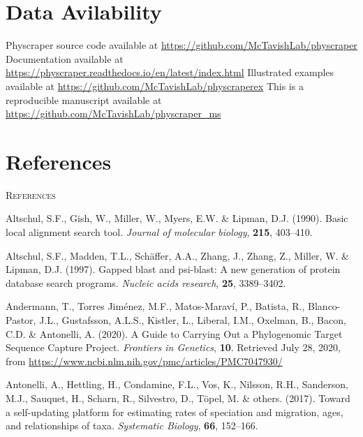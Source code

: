 \documentclass[]{article}
\begin{document}
\hypertarget{data-avilability}{%
\section{Data Avilability}\label{data-avilability}}

Physcraper source code available at \url{https://github.com/McTavishLab/physcraper}
Documentation available at \url{https://physcraper.readthedocs.io/en/latest/index.html}
Illustrated examples available at \url{https://github.com/McTavishLab/physcraperex}
This is a reproducible manuscript available at \url{https://github.com/McTavishLab/physcraper_ms}

\newpage

\hypertarget{references}{%
\section{References}\label{references}}

\newpage
\begin{center}
\textsc{References}
\end{center}

\hypertarget{refs}{}
\leavevmode\hypertarget{ref-altschul1990basic}{}%
Altschul, S.F., Gish, W., Miller, W., Myers, E.W. \& Lipman, D.J. (1990). Basic local alignment search tool. \emph{Journal of molecular biology}, \textbf{215}, 403--410.

\leavevmode\hypertarget{ref-altschul1997gapped}{}%
Altschul, S.F., Madden, T.L., Schäffer, A.A., Zhang, J., Zhang, Z., Miller, W. \& Lipman, D.J. (1997). Gapped blast and psi-blast: A new generation of protein database search programs. \emph{Nucleic acids research}, \textbf{25}, 3389--3402.

\leavevmode\hypertarget{ref-andermann2020guide}{}%
Andermann, T., Torres Jiménez, M.F., Matos-Maraví, P., Batista, R., Blanco-Pastor, J.L., Gustafsson, A.L.S., Kistler, L., Liberal, I.M., Oxelman, B., Bacon, C.D. \& Antonelli, A. (2020). A Guide to Carrying Out a Phylogenomic Target Sequence Capture Project. \emph{Frontiers in Genetics}, \textbf{10}. Retrieved July 28, 2020, from \url{https://www.ncbi.nlm.nih.gov/pmc/articles/PMC7047930/}

\leavevmode\hypertarget{ref-antonelli2017toward}{}%
Antonelli, A., Hettling, H., Condamine, F.L., Vos, K., Nilsson, R.H., Sanderson, M.J., Sauquet, H., Scharn, R., Silvestro, D., Töpel, M. \& others. (2017). Toward a self-updating platform for estimating rates of speciation and migration, ages, and relationships of taxa. \emph{Systematic Biology}, \textbf{66}, 152--166.
\end{document}

